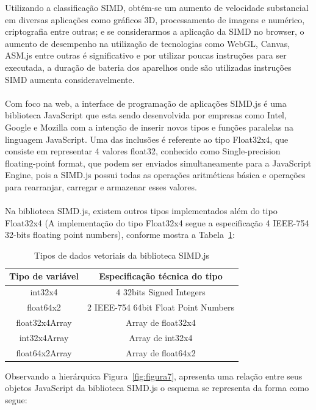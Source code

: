 \documentclass[12pt,a4paper]{article}
\begin{document}
Utilizando a classificação SIMD, obtém-se um aumento de velocidade substancial em diversas aplicações como gráficos 3D, processamento de imagens e numérico, criptografia entre outras; e se considerarmos a aplicação da SIMD no browser, o aumento de desempenho na utilização de tecnologias como WebGL, Canvas, ASM.js entre outras é significativo e por utilizar poucas instruções para ser executada, a duração de bateria dos aparelhos onde são utilizadas instruções SIMD aumenta consideravelmente. \\
\\
Com foco na web, a interface de programação de aplicações SIMD.js é uma biblioteca JavaScript que esta sendo desenvolvida por empresas como Intel, Google e Mozilla com a intenção de inserir novos tipos e funções paralelas na linguagem JavaScript. Uma das inclusões é referente ao tipo Float32x4, que consiste em representar 4 valores float32, conhecido como Single-precision floating-point format, que podem ser enviados simultaneamente para a JavaScript Engine, pois a SIMD.js possui todas as operações aritméticas básica e operações para rearranjar, carregar e armazenar esses valores. \\
\\
Na biblioteca SIMD.js, existem outros tipos implementados além do tipo Float32x4 (A implementação do tipo Float32x4 segue a especificação 4 IEEE-754 32-bits floating point numbers), conforme mostra a Tabela~\ref{tab:tabela1}: \\

\begin{table}[h]
\begin{center}
\begin{tabular}{|c|c|}
\hline
	Tipo de variável & Especificação técnica do tipo\\
\hline
	int32x4 & 4 32bits Signed Integers \\
\hline
	float64x2 & 2 IEEE-754 64bit Float Point Numbers \\
\hline
	float32x4Array & Array de float32x4 \\
\hline
	int32x4Array & Array de int32x4 \\
\hline
	float64x2Array & Array de float64x2 \\
\hline
\end{tabular}
\caption{Tipos de dados vetoriais da biblioteca SIMD.js}
\label{tab:tabela1}
\end{center}
\end{table}

Observando a hierárquica Figura~\ref{fig:figura7}, apresenta uma relação entre seus objetos JavaScript da biblioteca SIMD.js o esquema se representa da forma como segue: \\
\end{document}
